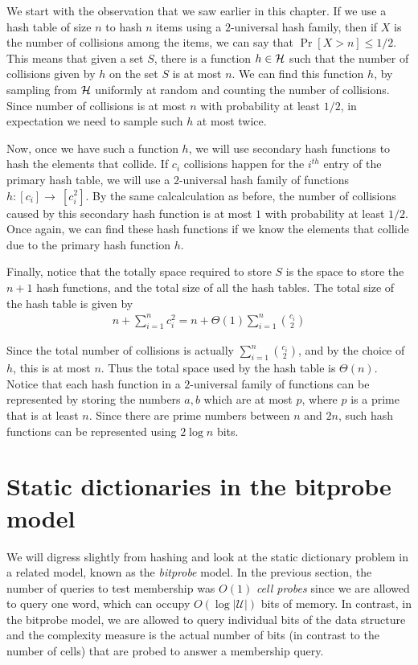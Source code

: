 We start with the observation that we saw earlier in this chapter. If we use a
hash table of size $n$ to hash $n$ items using a $2$-universal hash family, then
if $X$ is the number of collisions among the items, we can say that
$\Pr[X > n] \leq 1/2$. This means that given a set $S$, there is a function
$h\in {\cal H}$ such that the number of collisions given by $h$ on the set $S$
is at most $n$. We can find this function $h$, by sampling from ${\cal H}$
uniformly at random and counting the number of collisions. Since number of
collisions is at most $n$ with probability at least $1/2$, in expectation we
need to sample such $h$ at most twice.

Now, once we have such a function $h$, we will use secondary hash functions to
hash the elements that collide. If $c_i$ collisions happen for the $i^{th}$
entry of the primary hash table, we will use a $2$-universal hash family of
functions $h:[c_i] \to~[c_i^2]$. By the same calcalculation as before, the
number of collisions caused by this secondary hash function is at most $1$ with
probability at least $1/2$. Once again, we can find these hash functions if we
know the elements that collide due to the primary hash function $h$.

Finally, notice that the totally space required to store $S$ is the space to
store the $n+1$ hash functions, and the total size of all the hash tables. The
total size of the hash table is given by
\begin{align*}
  n + \sum_{i=1}^n c_i^2 = n + \Theta(1) \sum_{i=1}^n \binom{c_i}{2}
\end{align*}

Since the total number of collisions is actually $\sum_{i=1}^n \binom{c_i}{2}$,
and by the choice of $h$, this is at most $n$. Thus the total space used by the
hash table is $\Theta(n)$. Notice that each hash function in a $2$-universal
family of functions can be represented by storing the numbers $a, b$ which are
at most $p$, where $p$ is a prime that is at least $n$. Since there are prime
numbers between $n$ and $2n$, such hash functions can be represented using
$2\log n$ bits.

\section{Static dictionaries in the bitprobe model}

We will digress slightly from hashing and look at the static dictionary problem
in a related model, known as the \emph{bitprobe} model. In the previous section,
the number of queries to test membership was $O(1)$ \emph{cell probes} since we
are allowed to query one word, which can occupy $O(\log |\mathcal{U}|)$ bits of
memory. In contrast, in the bitprobe model, we are allowed to query individual
bits of the data structure and the complexity measure is the actual number of
bits (in contrast to the number of cells) that are probed to answer a membership
query.

